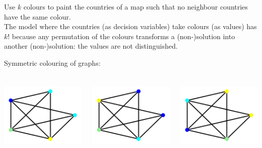 \documentclass{cons-beamer}
\begin{document}
\begin{frame}
  \begin{example}
    Use $k$ colours to paint the countries of a map such that no
    neighbour countries have the same colour. \\[+5pt] The
    model where the countries (as decision variables) take colours (as
    values) has $k!$  because any
    permutation of the colours transforms a (non-)solution into
    another (non-)solution: the values are not distinguished.
  \end{example}
  \vfill

  Symmetric colouring of graphs:
  \vfill

  \begin{columns}
    \begin{column}{0.33\textwidth}
      \includegraphics[height=35mm]{images/graph1.png}%
    \end{column}
    

    \begin{column}{0.33\textwidth}
      \includegraphics[height=35mm]{images/graph2.png}%
    \end{column}
    

    \begin{column}{0.33\textwidth}
      \includegraphics[height=35mm]{images/graph3.png}%
    \end{column}
  \end{columns}
\end{frame}
\end{document}
